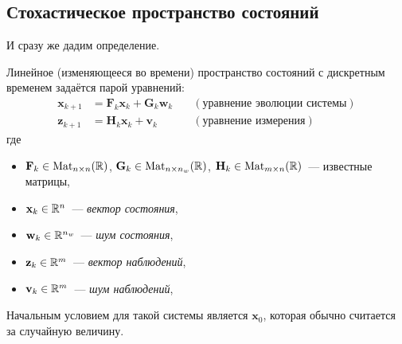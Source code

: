 \subsection{Стохастическое пространство состояний}
И сразу же дадим определение.
\begin{definition}
	Линейное (изменяющееся во времени) пространство состояний с дискретным 
	временем задаётся парой уравнений:
	\begin{align*}
		\mathbf{x}_{k + 1} &= \mathbf{F}_{k}\mathbf{x}_{k} + \mathbf{G}_{k} 
		\mathbf{w}_{k}& \quad (\text{уравнение эволюции системы}) \\
		\mathbf{z}_{k + 1} &= \mathbf{H}_{k}\mathbf{x}_{k} + \mathbf{v}_{k}&
		\quad (\text{уравнение измерения})
	\end{align*}
	где
	\begin{itemize}
		\item \(\mathbf{F}_{k} \in \mathrm{Mat}_{n \times n}(\mathbb{R})\), 
		\(\mathbf{G}_{k} \in \mathrm{Mat}_{n \times n_{w}}(\mathbb{R})\), 
		\(\mathbf{H}_{k} \in \mathrm{Mat}_{m \times n}(\mathbb{R})\)~--- известные 
		матрицы,
		\item \(\mathbf{x}_{k} \in \mathbb{R}^{n}\)~--- \emph{вектор состояния},
		\item \(\mathbf{w}_{k} \in \mathbb{R}^{n_{w}}\)~--- \emph{шум состояния},
		\item \(\mathbf{z}_{k} \in \mathbb{R}^{m}\)~--- \emph{вектор наблюдений},
		\item \(\mathbf{v}_{k} \in \mathbb{R}^{m}\)~--- \emph{шум наблюдений},
	\end{itemize}

	Начальным условием для такой системы является \(\mathbf{x}_{0}\), которая 
	обычно считается за случайную величину.
\end{definition}

